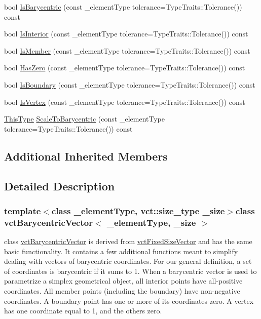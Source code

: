 \begin{DoxyCompactItemize}
\item 
bool \hyperlink{classvct_barycentric_vector_a2de0ea268bd899edf9feca4521e3c1b2}{Is\+Barycentric} (const \+\_\+element\+Type tolerance=Type\+Traits\+::\+Tolerance()) const 
\item 
bool \hyperlink{classvct_barycentric_vector_a06b03cc53b33eb0399e3aa5d4efc2b61}{Is\+Interior} (const \+\_\+element\+Type tolerance=Type\+Traits\+::\+Tolerance()) const 
\item 
bool \hyperlink{classvct_barycentric_vector_a57df6ff1bfb5a276a1b6c27fc760275c}{Is\+Member} (const \+\_\+element\+Type tolerance=Type\+Traits\+::\+Tolerance()) const 
\item 
bool \hyperlink{classvct_barycentric_vector_ac82837145f5adb20ebe37b807754abd5}{Has\+Zero} (const \+\_\+element\+Type tolerance=Type\+Traits\+::\+Tolerance()) const 
\item 
bool \hyperlink{classvct_barycentric_vector_a713cf8f0f4e3d3faaaca127a3e18c640}{Is\+Boundary} (const \+\_\+element\+Type tolerance=Type\+Traits\+::\+Tolerance()) const 
\item 
bool \hyperlink{classvct_barycentric_vector_a9c71ba81472565ed088271e92cb546c4}{Is\+Vertex} (const \+\_\+element\+Type tolerance=Type\+Traits\+::\+Tolerance()) const 
\item 
\hyperlink{classvct_barycentric_vector_af89123d5c607a28e2328d5d370dffb33}{This\+Type} \hyperlink{classvct_barycentric_vector_ab4436ebd020f3dcf542392391fe502c6}{Scale\+To\+Barycentric} (const \+\_\+element\+Type tolerance=Type\+Traits\+::\+Tolerance()) const 
\end{DoxyCompactItemize}
\subsection*{Additional Inherited Members}


\subsection{Detailed Description}
\subsubsection*{template$<$class \+\_\+element\+Type, vct\+::size\+\_\+type \+\_\+size$>$class vct\+Barycentric\+Vector$<$ \+\_\+element\+Type, \+\_\+size $>$}

class \hyperlink{classvct_barycentric_vector}{vct\+Barycentric\+Vector} is derived from \hyperlink{classvct_fixed_size_vector}{vct\+Fixed\+Size\+Vector} and has the same basic functionality. It contains a few additional functions meant to simplify dealing with vectors of barycentric coordinates. For our general definition, a set of coordinates is barycentric if it sums to 1. When a barycentric vector is used to parametrize a simplex geometrical object, all interior points have all-\/positive coordinates. All member points (including the boundary) have non-\/negative coordinates. A boundary point has one or more of its coordinates zero. A vertex has one coordinate equal to 1, and the others zero.

